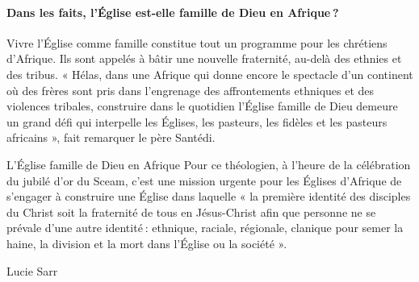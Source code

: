 \paragraph{ Dans les faits, l’Église est-elle famille de Dieu en Afrique ?}
Vivre l’Église comme famille constitue tout un programme pour les chrétiens d’Afrique. Ils sont appelés à bâtir une nouvelle fraternité, au-delà des ethnies et des tribus. « Hélas, dans une Afrique qui donne encore le spectacle d’un continent où des frères sont pris dans l’engrenage des affrontements ethniques et des violences tribales, construire dans le quotidien l’Église famille de Dieu demeure un grand défi qui interpelle les Églises, les pasteurs, les fidèles et les pasteurs africains », fait remarquer le père Santédi.

L’Église famille de Dieu en Afrique
Pour ce théologien, à l’heure de la célébration du jubilé d’or du Sceam, c’est une mission urgente pour les Églises d’Afrique de s’engager à construire une Église dans laquelle « la première identité des disciples du Christ soit la fraternité de tous en Jésus-Christ afin que personne ne se prévale d’une autre identité : ethnique, raciale, régionale, clanique pour semer la haine, la division et la mort dans l’Église ou la société ».

Lucie Sarr
 